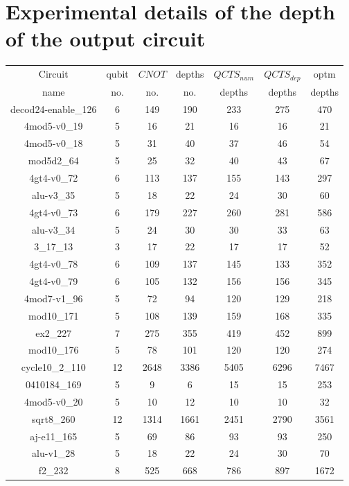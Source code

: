 \documentclass[runningheads]{llncs}
\begin{document}
\section{Experimental details of the depth of the output circuit}
					\begin{table}[H]
						\begin{center}  
						\begin{tabular}{|c|c|c|c|c|c|c|}
						\hline
						Circuit &  qubit  & $CNOT$ &depths &$QCTS_{num}$& $QCTS_{dep}$  & optm 	  	\\
						 name	&   no. 	&	no. & no. & depths&  depths &  depths 	\\
						\hline
						decod24-enable\_126 & 6 & 149 & 190 & 233 & 275 & 470 \\
4mod5-v0\_19 & 5 & 16 & 21 & 16 & 16 & 21 \\
4mod5-v0\_18 & 5 & 31 & 40 & 37 & 46 & 54 \\
mod5d2\_64 & 5 & 25 & 32 & 40 & 43 & 67 \\
4gt4-v0\_72 & 6 & 113 & 137 & 155 & 143 & 297 \\
alu-v3\_35 & 5 & 18 & 22 & 24 & 30 & 60 \\
4gt4-v0\_73 & 6 & 179 & 227 & 260 & 281 & 586 \\
alu-v3\_34 & 5 & 24 & 30 & 30 & 33 & 63 \\
3\_17\_13 & 3 & 17 & 22 & 17 & 17 & 52 \\
4gt4-v0\_78 & 6 & 109 & 137 & 145 & 133 & 352 \\
4gt4-v0\_79 & 6 & 105 & 132 & 156 & 156 & 345 \\
4mod7-v1\_96 & 5 & 72 & 94 & 120 & 129 & 218 \\
mod10\_171 & 5 & 108 & 139 & 159 & 168 & 335 \\
ex2\_227 & 7 & 275 & 355 & 419 & 452 & 899 \\
mod10\_176 & 5 & 78 & 101 & 120 & 120 & 274 \\
cycle10\_2\_110 & 12 & 2648 & 3386 & 5405 & 6296 & 7467 \\
0410184\_169 & 5 & 9 & 6 & 15 & 15 & 253 \\
4mod5-v0\_20 & 5 & 10 & 12 & 10 & 10 & 32 \\
sqrt8\_260 & 12 & 1314 & 1661 & 2451 & 2790 & 3561 \\
aj-e11\_165 & 5 & 69 & 86 & 93 & 93 & 250 \\
alu-v1\_28 & 5 & 18 & 22 & 24 & 30 & 70 \\
f2\_232 & 8 & 525 & 668 & 786 & 897 & 1672 \\

\end{tabular}
\end{center}
\end{table}
\end{document}
